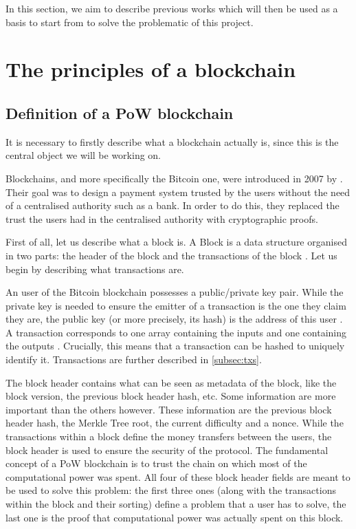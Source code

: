 In this section, we aim to describe previous works which will then be used as a basis to start from to solve the problematic of this project.
    
\section{The principles of a blockchain}
    \subsection{Definition of a PoW blockchain}
        It is necessary to firstly describe what a blockchain actually is, since this is the central object we will be working on.
        
        Blockchains, and more specifically the Bitcoin one, were introduced in 2007 by \citeauthor{Bitcoin} \cite{Bitcoin}. Their goal was to design a payment system trusted by the users without the need of a centralised authority such as a bank. In order to do this, they replaced the trust the users had in the centralised authority with cryptographic proofs.
        
        First of all, let us describe what a block is. A Block is a data structure organised in two parts: the header of the block and the transactions of the block \cite{BitcoinHeader}. Let us begin by describing what transactions are.
        
        An user of the Bitcoin blockchain possesses a public/private key pair. While the private key is needed to ensure the emitter of a transaction is the one they claim they are, the public key (or more precisely, its hash) is the address of this user \cite{BitcoinTX}. A transaction corresponds to one array containing the inputs and one containing the outputs \cite{SoK}. Crucially, this means that a transaction can be hashed to uniquely identify it. Transactions are further described in \autoref{subsec:txs}.
        
        The block header contains what can be seen as metadata of the block, like the block version, the previous block header hash, etc. Some information are more important than the others however. These information are the previous block header hash, the Merkle Tree root, the current difficulty and a nonce. While the transactions within a block define the money transfers between the users, the block header is used to ensure the security of the protocol. The fundamental concept of a PoW blockchain is to trust the chain on which most of the computational power was spent. All four of these block header fields are meant to be used to solve this problem: the first three ones (along with the transactions within the block and their sorting) define a problem that a user has to solve, the last one is the proof that computational power was actually spent on this block.
        
